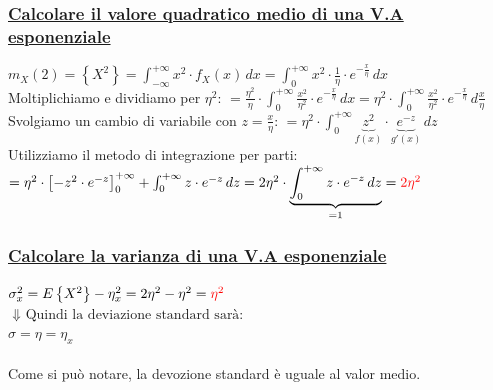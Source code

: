 \documentclass{article}
\begin{document}
\subsubsection{\underline{Calcolare il valore quadratico medio di una V.A esponenziale}}
$m_X(2) = \left\{ X^2 \right\} = \int_{-\infty}^{+\infty} x^2 \cdot f_X(x) \,dx = \int_{0}^{+\infty} x^2 \cdot \frac 1 \eta \cdot e^{-\frac x \eta} \,dx$ \\
Moltiplichiamo e dividiamo per $\eta^2$: $= \frac{\eta^2}{\eta} \cdot \int_{0}^{+\infty} \frac{x^{2}}{\eta^2} \cdot e^{-\frac x \eta} \,dx =
\eta^2 \cdot \int_{0}^{+\infty} \frac{x^{2}}{\eta^2} \cdot e^{-\frac x \eta} \,d \frac x \eta$ \\
Svolgiamo un cambio di variabile con $z = \frac x \eta$: $= \eta^2 \cdot \int_{0}^{+\infty} \underset{f(x)}{\underbrace{z^2}} \cdot \underset{g'(x)}{\underbrace{e^{-z}}} \,dz$ \\
Utilizziamo il metodo di integrazione per parti: \\
$= \eta^2 \cdot \left[ -z^2 \cdot e^{-z} \right]_0^{+\infty} + \int_{0}^{+\infty} z \cdot e^{-z} \,dz = 2\eta^2 \cdot \underset{=1}{\underbrace{\int_{0}^{+\infty} z \cdot e^{-z} \,dz}} = \color{red} 2\eta^2$
\subsubsection{\underline{Calcolare la varianza di una V.A esponenziale}}
$\sigma_x^2 = E\left\{ X^2 \right\} - \eta_x^2 = 2\eta^2 - \eta^2 = \color{red} \eta^2$ \\
$\Downarrow \text{ Quindi la deviazione standard sarà:}$ \\
$\sigma = \eta = \eta_x$ \\ \\
Come si può notare, la devozione standard è uguale al valor medio.
\end{document}
